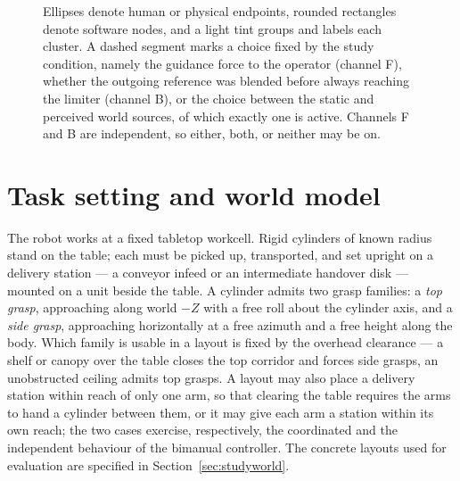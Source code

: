 \documentclass[12pt,a4paper,twoside,openright]{report}
\begin{document}
\begin{figure}[t]
\caption{Ellipses denote human or physical endpoints, rounded rectangles denote software nodes, and a light tint groups and labels each cluster. A dashed segment marks a choice fixed by the study condition, namely the guidance force to the operator (channel F), whether the outgoing reference was blended before always reaching the limiter (channel B), or the choice between the static and perceived world sources, of which exactly one is active. Channels F and B are independent, so either, both, or neither may be on.}
\label{fig:arch}
\end{figure}

\section{Task setting and world model}
\label{sec:task}

The robot works at a fixed tabletop workcell. Rigid cylinders of known radius stand on the table; each must be picked up, transported, and set upright on a delivery station --- a conveyor infeed or an intermediate handover disk --- mounted on a unit beside the table. A cylinder admits two grasp families: a \emph{top grasp}, approaching along world $-Z$ with a free roll about the cylinder axis, and a \emph{side grasp}, approaching horizontally at a free azimuth and a free height along the body. Which family is usable in a layout is fixed by the overhead clearance --- a shelf or canopy over the table closes the top corridor and forces side grasps, an unobstructed ceiling admits top grasps. A layout may also place a delivery station within reach of only one arm, so that clearing the table requires the arms to hand a cylinder between them, or it may give each arm a station within its own reach; the two cases exercise, respectively, the coordinated and the independent behaviour of the bimanual controller. The concrete layouts used for evaluation are specified in Section~\ref{sec:studyworld}.
\end{document}
